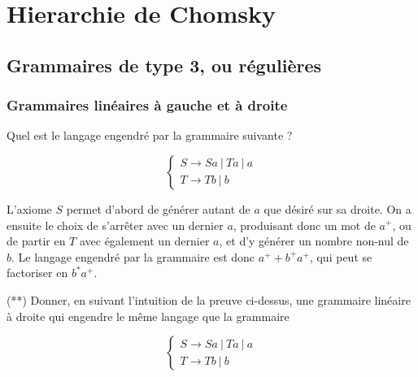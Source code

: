 \section{Hierarchie de Chomsky}


\subsection{Grammaires de type 3, ou régulières}

\subsubsection{Grammaires linéaires à gauche et à droite}


\begin{exercice}
Quel est le langage engendré par la grammaire suivante ?

\[
\begin{cases}
S \rightarrow Sa~|~Ta~|~a \\
T \rightarrow Tb~|~b
\end{cases}
\]

\end{exercice}

\begin{correction*}

L'axiome $S$ permet d'abord de générer autant de $a$ que désiré sur sa droite. On a ensuite le choix de s'arrêter avec un dernier $a$, produisant donc un mot de $a^+$, ou de partir en $T$ avec également un dernier $a$, et d'y générer un nombre non-nul de $b$. Le langage engendré par la grammaire est donc $a^+ + b^+a^+$, qui peut se factoriser en $b^*a^+$.

\end{correction*}


\begin{exercice}(**) Donner, en suivant l'intuition de la preuve ci-dessus, une grammaire linéaire à droite qui engendre le même langage que la grammaire 

\[
\begin{cases}
S \rightarrow Sa~|~Ta~|~a \\
T \rightarrow Tb~|~b
\end{cases}
\]

\end{exercice}

